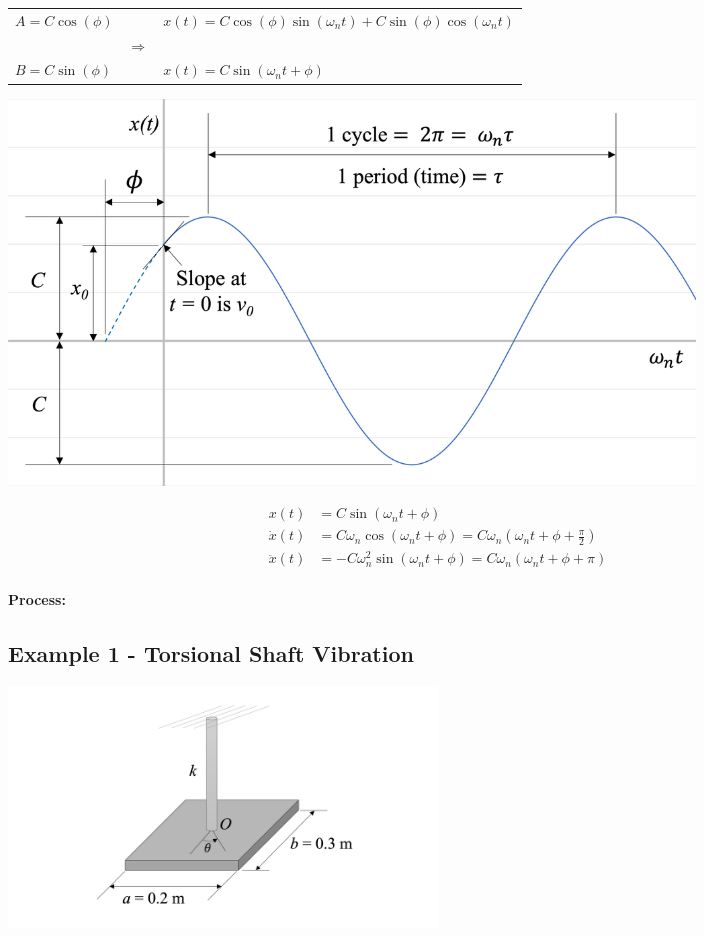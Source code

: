 \documentclass[12pt,letterpaper,twoside]{report}
\begin{document}
\begin{center}
\begin{tabu} to 1\textwidth {   X[1, c]  X[1, C]  X[1, C]  }
$A = C \cos (\phi)$ & & $x(t) = C \cos (\phi) \sin (\omega_n t) + C \sin (\phi) \cos (\omega_n t)$ \\
& $\Rightarrow$ & \\
$B = C \sin (\phi)$ & & $x(t) = C \sin (\omega_n t + \phi)$\\
\end{tabu}
\end{center}

\includegraphics[trim={0cm 0cm 0cm 0cm},clip,width=0.8\textwidth, center]{Slide75}

\begin{align*}
x(t) &= C \sin (\omega_n t+ \phi)\\
\dot{x}(t) &= C \omega_n \cos (\omega_n t+ \phi) = C  \omega_n \left( \omega_n t + \phi + \frac{\pi}{2} \right)\\
\ddot{x}(t) &= - C \omega_n^2 \sin (\omega_n t+ \phi) = C  \omega_n \left( \omega_n t + \phi + \pi \right)\\
\end{align*}

\textbf{Process:}
\vspace*{20\baselineskip}


\subsection{Example 1 - Torsional Shaft Vibration}


\includegraphics[trim={6cm 0cm 5cm 0cm},clip,width=0.5\textwidth, left]{Slide77}
\end{document}
